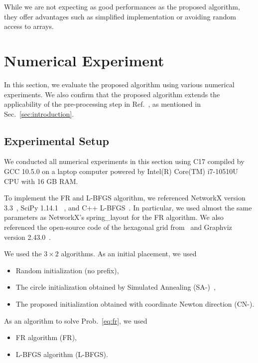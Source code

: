 \documentclass[dvipdfmx,10pt,journal,compsoc]{IEEEtran}
\newcommand{\Cpp}{C\nolinebreak[4]\hspace{-.05em}\raisebox{.4ex}{\relsize{-3}{\textbf{++}}}}
\begin{document}
While we are not expecting as good performances as the proposed algorithm, they offer advantages such as simplified implementation or avoiding random access to arrays.

\section{Numerical Experiment} \label{sec:experiment}

In this section, we evaluate the proposed algorithm using various numerical experiments.
We also confirm that the proposed algorithm extends the applicability of the pre-processing step in Ref.~\cite{ghassemitoosiSimulatedAnnealingPreProcessing2016}, as mentioned in Sec.~\ref{sec:introduction}.

\subsection{Experimental Setup}\label{ssec:setup}

We conducted all numerical experiments in this section using \Cpp17 compiled by GCC 10.5.0 on a laptop computer powered by Intel(R) Core(TM) i7-10510U CPU with 16 GB RAM.

To implement the FR and L-BFGS algorithm, we referenced NetworkX version 3.3~\cite{hagberg2008exploring}, SciPy 1.14.1 ~\cite{2020SciPy-NMeth}, and C++ L-BFGS~\cite{qiuYixuanLBFGSpp2024,okazakiChokkanLiblbfgs2024}. In particular, we used almost the same parameters as NetworkX's \textsf{spring\_layout} for the FR algorithm.
We also referenced the open-source code of the hexagonal grid from~\cite{patelHexagonalGrids2013} and Graphviz version 2.43.0~\cite{ellsonGraphvizOpenSource2002}.

We used the $3 \times 2$ algorithms.
As an initial placement, we used
\begin{itemize}
  \item Random initialization (no prefix),
  \item The circle initialization obtained by Simulated Annealing (\textsf{SA-})~\cite{ghassemitoosiSimulatedAnnealingPreProcessing2016},
  \item The proposed initialization obtained with coordinate Newton direction (\textsf{CN-}).
\end{itemize}
As an algorithm to solve Prob.~\eqref{eq:fr}, we used
\begin{itemize}
  \item FR algorithm (\textsf{FR}),
  \item L-BFGS algorithm (\textsf{L-BFGS}).
\end{itemize}
\end{document}
